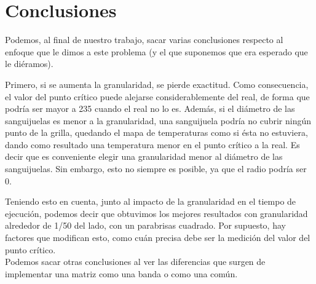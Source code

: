 \documentclass[a4paper]{article}
\begin{document}
\newpage

\section{Conclusiones}
\label{sec:conclusiones}

Podemos, al final de nuestro trabajo, sacar varias conclusiones respecto al enfoque que le dimos a este problema (y el que suponemos que era esperado que le diéramos).

Primero, si se aumenta la granularidad, se pierde exactitud. Como consecuencia, el valor del punto crítico puede alejarse considerablemente del real, de forma que podría ser mayor a 235 cuando el real no lo es. Además, si el diámetro de las sanguijuelas es menor a la granularidad, una sanguijuela podría no cubrir ningún punto de la grilla, quedando el mapa de temperaturas como si ésta no estuviera, dando como resultado una temperatura menor en el punto crítico a la real. Es decir que es conveniente elegir una granularidad menor al diámetro de las sanguijuelas. Sin embargo, esto no siempre es posible, ya que el radio podría ser 0.

Teniendo esto en cuenta, junto al impacto de la granularidad en el tiempo de ejecución, podemos decir que obtuvimos los mejores resultados con granularidad alrededor de 1/50 del lado, con un parabrisas cuadrado. Por supuesto, hay factores que modifican esto, como cuán precisa debe ser la medición del valor del punto crítico.\\

Podemos sacar otras conclusiones al ver las diferencias que surgen de implementar una matriz como una banda o como una común.
\end{document}
